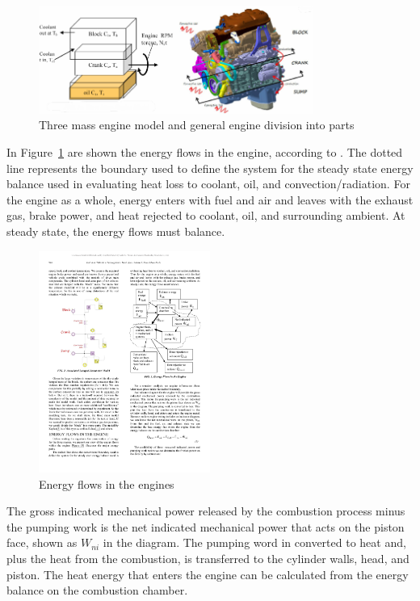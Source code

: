 \begin{figure}[ht]
  \centering
  \includegraphics[width=0.8\textwidth]{figures/model/engine_mass_scheme.pdf}
  \caption{Three mass engine model and general engine division into parts\label{fig:engine_mass_scheme} }
\end{figure}

In Figure~\ref{fig:engine_mass_scheme} are shown the energy flows in the engine, according to \cite{Scott2012}. The dotted line represents the boundary used to define the system for the steady state energy balance used in evaluating heat loss to coolant, oil, and convection/radiation. For the engine as a whole, energy enters with fuel and air and leaves with the exhaust gas, brake power, and heat rejected to coolant, oil, and surrounding ambient. At steady state, the energy flows must balance.

\begin{figure}[ht]
  \centering
  \includegraphics[width=0.5\textwidth]{figures/model/energy_flows.pdf}
  \caption{Energy flows in the engines\label{fig:energy_flows} }
\end{figure}

The gross indicated mechanical power released by the combustion process minus the pumping work is the net indicated mechanical power that acts on the piston face, shown as $W_{ni}$ in the diagram. The pumping word in converted to heat and, plus the heat from the combustion, is transferred to the cylinder walls, head, and piston. The heat energy that enters the engine can be calculated from the energy balance on the combustion chamber.


